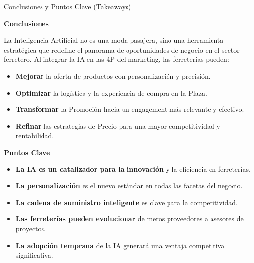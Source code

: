 \documentclass[aspectratio=169]{beamer}
\begin{document}
\begin{frame}{Conclusiones y Puntos Clave (Takeaways)}


\textbf{Conclusiones}

La Inteligencia Artificial no es una moda pasajera, sino una herramienta estratégica que redefine el panorama de oportunidades de negocio en el sector ferretero. Al integrar la IA en las 4P del marketing, las ferreterías pueden:

\begin{itemize}
  \item \textbf{Mejorar} la oferta de productos con personalización y precisión.
  \item \textbf{Optimizar} la logística y la experiencia de compra en la Plaza.
  \item \textbf{Transformar} la Promoción hacia un engagement más relevante y efectivo.
  \item \textbf{Refinar} las estrategias de Precio para una mayor competitividad y rentabilidad.
\end{itemize}
\textbf{Puntos Clave}

\begin{itemize}
  \item \textbf{La IA es un catalizador para la innovación} y la eficiencia en ferreterías.
  \item \textbf{La personalización} es el nuevo estándar en todas las facetas del negocio.
  \item \textbf{La cadena de suministro inteligente} es clave para la competitividad.
  \item \textbf{Las ferreterías pueden evolucionar} de meros proveedores a asesores de proyectos.
  \item \textbf{La adopción temprana} de la IA generará una ventaja competitiva significativa.
\end{itemize}
\end{frame}
\end{document}
